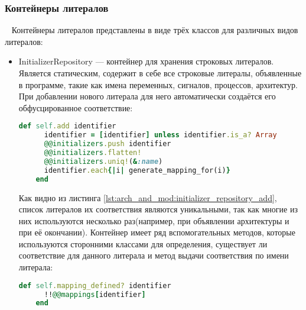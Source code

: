 \subsubsection{Контейнеры литералов}~
  Контейнеры литералов представлены в виде трёх классов для различных видов литералов:
  \begin{itemize}
  \item InitializerRepository --- контейнер для хранения строковых литералов. Является статическим, содержит в себе все строковые литералы, объявленные в программе, такие как имена переменных, сигналов, процессов, архитектур. При добавлении нового литерала для него автоматически создаётся его обфусцированное соответствие:
  \begin{lstlisting}[language=Ruby, style=rubystyle,caption={Определение метода перевода класса в строку для примитива component instantiation}, label=lst:arch_and_mod:initializer_repository_add]
    def self.add identifier
      identifier = [identifier] unless identifier.is_a? Array
      @@initializers.push identifier
      @@initializers.flatten!
      @@initializers.uniq!(&:name)
      identifier.each{|i| generate_mapping_for(i)}
    end
  \end{lstlisting}

  Как видно из листинга \ref{lst:arch_and_mod:initializer_repository_add}, список литералов их соответствия являются уникальными, так как многие из них используются несколько раз(например, при объявлении архитектуры и при её окончании).
  Контейнер имеет ряд вспомогательных методов, которые используются сторонними классами для определения, существует ли соответствие для данного литерала и метод выдачи соответствия по имени литерала:

  \begin{lstlisting}[language=Ruby, style=rubystyle,caption={Вспомогательные методы контейнера}, label=lst:arch_and_mod:support_methods]
    def self.mapping_defined? identifier
      !!@@mappings[identifier]
    end


\end{lstlisting}
\end{itemize}
